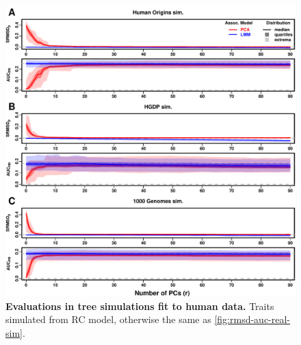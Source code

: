 \documentclass[11pt]{article}
\begin{document}
\begin{figure}[hp!]
  \centering
  \includegraphics[width=\textwidth,height=\textheight,keepaspectratio]{rmsd-auc-real-sim.pdf}
  \caption{
    {\small 
      {\bf Evaluations in tree simulations fit to human data.}
      Traits simulated from RC model, otherwise the same as \cref{fig:rmsd-auc-real-sim}.
    }
  }
  \label{fig:rmsd-auc-real-sim-rc}
\end{figure}
\end{document}

